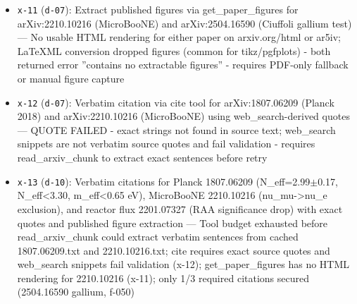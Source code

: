\documentclass[11pt,a4paper]{article}
\begin{document}
\begin{itemize}
  \item \texttt{x-11} (\texttt{d-07}): Extract published figures via get\_paper\_figures for arXiv:2210.10216 (MicroBooNE) and arXiv:2504.16590 (Ciuffoli gallium test) --- No usable HTML rendering for either paper on arxiv.org/html or ar5iv; LaTeXML conversion dropped figures (common for tikz/pgfplots) - both returned error ''contains no extractable figures'' - requires PDF-only fallback or manual figure capture
  \item \texttt{x-12} (\texttt{d-07}): Verbatim citation via cite tool for arXiv:1807.06209 (Planck 2018) and arXiv:2210.10216 (MicroBooNE) using web\_search-derived quotes --- QUOTE FAILED - exact strings not found in source text; web\_search snippets are not verbatim source quotes and fail validation - requires read\_arxiv\_chunk to extract exact sentences before retry
  \item \texttt{x-13} (\texttt{d-10}): Verbatim citations for Planck 1807.06209 (N\_eff=2.99$\pm$0.17, N\_eff\textless{}3.30, m\_eff\textless{}0.65 eV), MicroBooNE 2210.10216 (nu\_mu-\textgreater{}nu\_e exclusion), and reactor flux 2201.07327 (RAA significance drop) with exact quotes and published figure extraction --- Tool budget exhausted before read\_arxiv\_chunk could extract verbatim sentences from cached 1807.06209.txt and 2210.10216.txt; cite requires exact source quotes and web\_search snippets fail validation (x-12); get\_paper\_figures has no HTML rendering for 2210.10216 (x-11); only 1/3 required citations secured (2504.16590 gallium, f-050)
\end{itemize}
\end{document}

